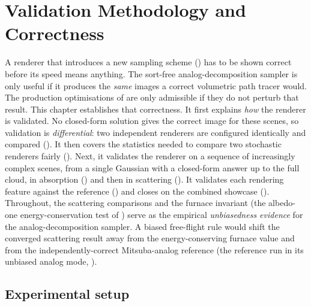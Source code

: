 \chapter{Validation Methodology and Correctness}
\label{ch:validation}

A renderer that introduces a new sampling scheme () has to be shown
correct before its speed means anything. The
sort-free analog-decomposition sampler is only useful if it produces the \emph{same} images a correct
volumetric path tracer would. The production optimisations of  are only
admissible if they do not perturb that result. This chapter establishes that correctness. It first
explains \emph{how} the renderer is validated. No closed-form solution gives the correct image for these
scenes, so validation is \emph{differential}: two independent renderers are configured
identically and compared (). It then covers the statistics needed to compare two
stochastic renderers fairly (). Next, it validates the renderer
on a sequence of increasingly
complex scenes, from a single Gaussian with a closed-form answer up to the full cloud, in absorption
() and then in scattering (). It validates each
rendering feature against the reference () and closes on the combined
showcase (). Throughout, the scattering comparisons and the furnace
invariant (the albedo-one energy-conservation test of ) serve as the
empirical \emph{unbiasedness evidence} for the analog-decomposition sampler. A
biased free-flight rule would shift the converged scattering result away from the energy-conserving
furnace value and from the independently-correct Mitsuba-analog reference (the reference run in its
unbiased analog mode, ).

\section{Experimental setup}
\label{sec:setup}

